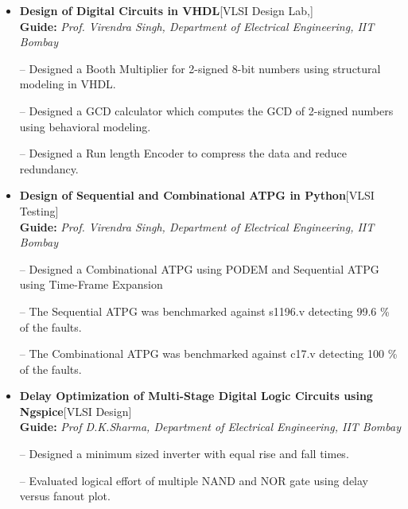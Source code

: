 \documentclass{article}
\newcommand{\hilight}[1]{\colorbox{light-gray}{#1}}
\def\vsp{6pt}
\begin{document}
\begin{itemize}
\item \textbf{Design of Digital Circuits in VHDL}\hfill{\textcolor{pigment}{[VLSI Design Lab,]}}\\
\textbf{Guide:} \textit{Prof. Virendra Singh, Department of Electrical Engineering, IIT Bombay} 
\item[--] Designed a Booth Multiplier for 2-signed 8-bit numbers using structural modeling in VHDL.
\item[--] Designed a GCD calculator which computes the GCD of 2-signed numbers using behavioral modeling.
\item[--] Designed a Run length Encoder to compress the data and reduce redundancy. 

\item \textbf{Design of Sequential and Combinational ATPG in Python}\hfill{\textcolor{pigment}{[VLSI Testing]}}\\
\textbf{Guide:} \textit{Prof. Virendra Singh, Department of Electrical Engineering, IIT Bombay} 
\item[--] Designed a Combinational ATPG using PODEM and Sequential ATPG using Time-Frame Expansion
\item[--] The Sequential ATPG was benchmarked against s1196.v detecting 99.6 \% of the faults.
\item[--] The Combinational ATPG was benchmarked against c17.v detecting 100 \% of the faults.
\item \textbf{Delay Optimization of Multi-Stage Digital Logic Circuits using Ngspice}\hfill{\textcolor{pigment}{[VLSI Design]}}\\
\textbf{Guide:} \textit{Prof D.K.Sharma, Department of Electrical Engineering, IIT Bombay} 
\item[--] Designed a minimum sized inverter with equal rise and fall times. 
\item[--] Evaluated logical effort of multiple NAND and NOR gate using delay versus fanout plot.
\end{itemize}
\vspace{-3mm}
\end{document}
